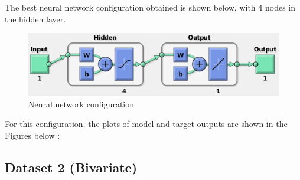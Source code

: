 \documentclass{article}
\begin{document}
The best neural network configuration obtained is shown below, with 4 nodes in the hidden layer.



\begin{figure}[H]
\centering
\includegraphics[width=\linewidth]{Regression/univariate/net_config.png}
\caption{Neural network configuration}
\end{figure}

For this configuration, the plots of model and target outputs are shown in the Figures below : 




\subsection{Dataset 2 (Bivariate)}




%
%
\end{document}
